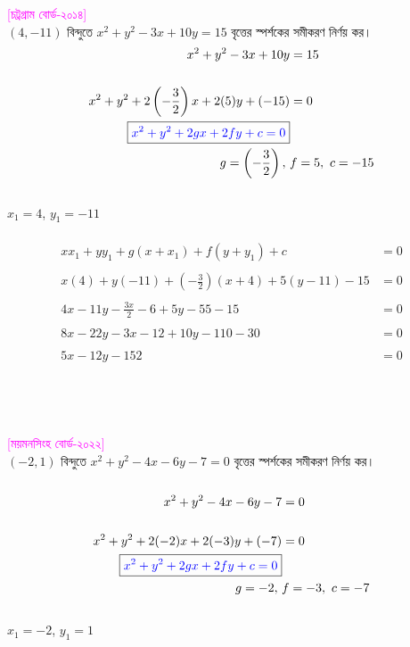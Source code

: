 \documentclass{article}
\begin{document}
\textcolor{magenta}{[চট্রগ্রাম বোর্ড-২০১৪]}\\ 
$(4,-11)$ বিন্দুতে  $x^2+y^2-3x+10y=15$ বৃত্তের স্পর্শকের সমীকরণ নির্ণয় কর। \\ 
\begin{align*}
	x^2+y^2-3x+10y&=15\\
	\\
		x^2+y^2+2\left(-\frac{3}{2}\right)x+2(5)y+(-15)&=0\\
		\boxed{\textcolor{blue}{x^2+y^2+2gx+2fy+c=0}}&\\
		g=\left(-\frac{3}{2}\right),\,\,&f=5,\,\,c=-15
\end{align*}
\\
$x_1=4$,\,\,$y_1=-11$\\
\\
\begin{align*}
xx_1+yy_1+g(x+x_1)+f(y+y_1)+c&=0\\
\\
x(4)+y(-11)+\left(-\frac{3}{2}\right)(x+4)+5(y-11)-15&=0\\
\\
4x-11y-\frac{3x}{2}-6+5y-55-15&=0\\
\\
8x-22y-3x-12+10y-110-30&=0\\
\\
5x-12y-152&=0\\
\end{align*}
	\\
\\
\\ 
\textcolor{magenta}{[ময়মনসিংহ বোর্ড-২০২২]}\\ 
$(-2,1)$ বিন্দুতে  $x^2+y^2-4x-6y-7=0$ বৃত্তের স্পর্শকের সমীকরণ নির্ণয় কর। \\ 
\\
\begin{align*}
x^2+y^2-4x-6y-7&=0\\
	\\
	x^2+y^2+2(-2)x+2(-3)y+(-7)&=0\\
	\boxed{\textcolor{blue}{x^2+y^2+2gx+2fy+c=0}}&\\
	g=-2,\,\,&f=-3,\,\,c=-7
\end{align*}
\\
$x_1=-2$,\,\,$y_1=1$\\
\end{document}
